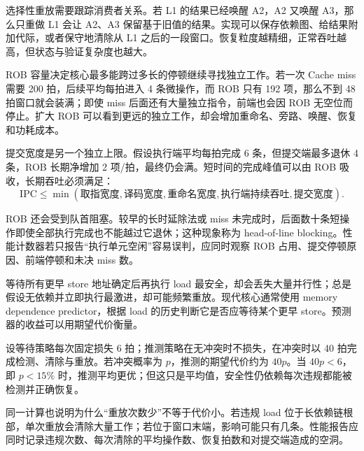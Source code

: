 选择性重放需要跟踪消费者关系。若 L1 的结果已经唤醒 A2，A2 又唤醒 A3，那么只重做 L1 会让 A2、A3 保留基于旧值的结果。实现可以保存依赖图、给结果附加代际，或者保守地清除从 L1 之后的一段窗口。恢复粒度越精细，正常吞吐越高，但状态与验证复杂度也越大。


ROB 容量决定核心最多能跨过多长的停顿继续寻找独立工作。若一次 Cache miss 需要 200 拍，后续平均每拍进入 4 条微操作，而 ROB 只有 192 项，那么不到 48 拍窗口就会装满；即使 miss 后面还有大量独立指令，前端也会因 ROB 无空位而停止。扩大 ROB 可以看到更远的独立工作，却会增加重命名、旁路、唤醒、恢复和功耗成本。

提交宽度是另一个独立上限。假设执行端平均每拍完成 6 条，但提交端最多退休 4 条，ROB 长期净增加 2 项/拍，最终仍会满。短时间的完成峰值可以由 ROB 吸收，长期吞吐必须满足：
\[
\text{IPC} \leq \min(\text{取指宽度},\text{译码宽度},\text{重命名宽度},
\text{执行端持续吞吐},\text{提交宽度}).
\]

ROB 还会受到队首阻塞。较早的长时延除法或 miss 未完成时，后面数十条短操作即使全部执行完成也不能越过它退休；这种现象称为 head-of-line blocking。性能计数器若只报告“执行单元空闲”容易误判，应同时观察 ROB 占用、提交停顿原因、前端停顿和未决 miss 数。


等待所有更早 store 地址确定后再执行 load 最安全，却会丢失大量并行性；总是假设无依赖并立即执行最激进，却可能频繁重放。现代核心通常使用 memory dependence predictor，根据 load 的历史判断它是否应等待某个更早 store。预测器的收益可以用期望代价衡量。

设等待策略每次固定损失 6 拍；推测策略在无冲突时不损失，在冲突时以 40 拍完成检测、清除与重放。若冲突概率为 $p$，推测的期望代价约为 $40p$。当 $40p<6$，即 $p<15\%$ 时，推测平均更优；但这只是平均值，安全性仍依赖每次违规都能被检测并正确恢复。

同一计算也说明为什么“重放次数少”不等于代价小。若违规 load 位于长依赖链根部，单次重放会清除大量工作；若位于窗口末端，影响可能只有几条。性能报告应同时记录违规次数、每次清除的平均操作数、恢复拍数和对提交端造成的空洞。

























